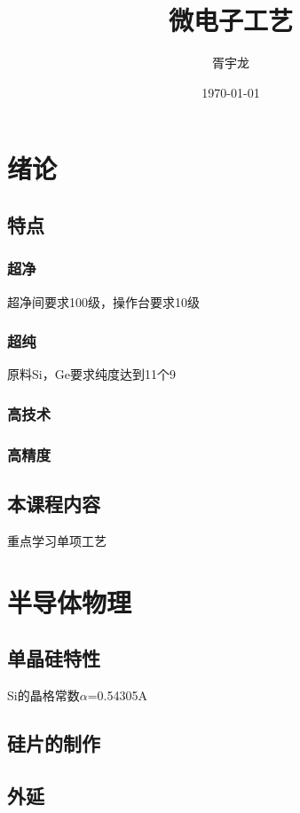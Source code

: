 \documentclass[12pt]{ctexart}
\title{微电子工艺}
\author{胥宇龙}
\date{\today}
\begin{document}
\section{绪论}
\subsection{特点}
\subsubsection{超净}
超净间要求100级，操作台要求10级
\subsubsection{超纯}
原料Si，Ge要求纯度达到11个9
\subsubsection{高技术}
\subsubsection{高精度}
\subsection{本课程内容}
重点学习单项工艺
\section{半导体物理}
\subsection{单晶硅特性}
Si的晶格常数$\alpha$=0.54305A

\subsection{硅片的制作}
\subsection{外延}
\end{document}
